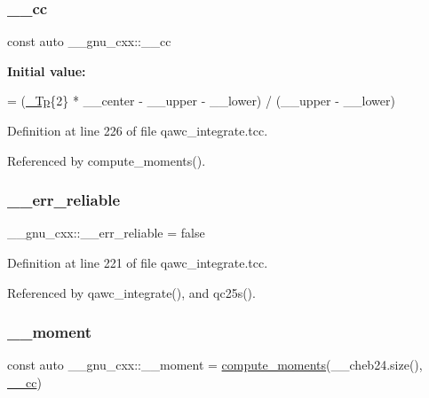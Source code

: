 \subsubsection{\texorpdfstring{\+\_\+\+\_\+cc}{\_\_cc}}
{\footnotesize\ttfamily const auto \+\_\+\+\_\+gnu\+\_\+cxx\+::\+\_\+\+\_\+cc}

{\bfseries Initial value\+:}
\begin{DoxyCode}
= (\hyperlink{namespace____gnu__cxx_a3b19a9c800ca194374ef9172290f7d79}{\_Tp}\{2\} * \_\_center - \_\_upper - \_\_lower)
                      / (\_\_upper - \_\_lower)
\end{DoxyCode}


Definition at line 226 of file qawc\+\_\+integrate.\+tcc.



Referenced by compute\+\_\+moments().

\mbox{\label{namespace____gnu__cxx_a989f5db5dc6da4eeca54cd1f93ec82ee}} 
\subsubsection{\texorpdfstring{\+\_\+\+\_\+err\+\_\+reliable}{\_\_err\_reliable}}
{\footnotesize\ttfamily \+\_\+\+\_\+gnu\+\_\+cxx\+::\+\_\+\+\_\+err\+\_\+reliable = false}



Definition at line 221 of file qawc\+\_\+integrate.\+tcc.



Referenced by qawc\+\_\+integrate(), and qc25s().

\mbox{\label{namespace____gnu__cxx_aa353478f1f8d25130d4fc48bf804a24c}} 
\subsubsection{\texorpdfstring{\+\_\+\+\_\+moment}{\_\_moment}}
{\footnotesize\ttfamily const auto \+\_\+\+\_\+gnu\+\_\+cxx\+::\+\_\+\+\_\+moment = \hyperlink{namespace____gnu__cxx_a698ae16aa1c82aa755f3703cc20e2b8e}{compute\+\_\+moments}(\+\_\+\+\_\+cheb24.\+size(), \hyperlink{namespace____gnu__cxx_a7994ff975ddada084e4a738578302940}{\+\_\+\+\_\+cc})}



